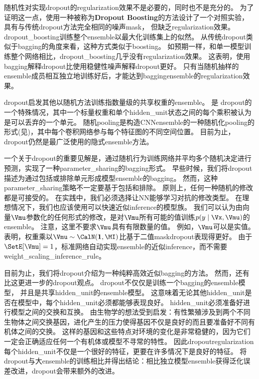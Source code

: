 
随机性对实现\gls{dropout}的\gls{regularization}效果不是必要的，同时也不是充分的。
为了证明这一点，\cite{WardeFarley+al-ICLR2014}使用一种被称为\textbf{Dropout Boosting}的方法设计了一个对照实验，具有与传统\gls{dropout}方法完全相同的噪声\gls{mask}， 但缺乏\gls{regularization}效果。
\gls{dropout_boosting}训练整个\gls{ensemble}以最大化训练集上的似然。
从传统\gls{dropout}类似于\gls{bagging}的角度来看，这种方式类似于\gls{boosting}。
如预期一样，和单一模型训练整个网络相比，\gls{dropout_boosting}几乎没有\gls{regularization}效果。
这表明，使用\gls{bagging}解释\gls{dropout}比使用稳健性噪声解释\gls{dropout}更好。
只有当随机抽样的\gls{ensemble}成员相互独立地训练好后，才能达到\gls{bagging}\gls{ensemble}的\gls{regularization}效果。

\gls{dropout}启发其他以随机方法训练指数量级的共享权重的\gls{ensemble}。
是
\gls{dropout}的一个特殊情况，其中一个标量权重和单个\gls{hidden_unit}状态之间的每个乘积被认为是可以丢弃的一个单元\citep{Wan+al-ICML2013-small}。
随机\gls{pooling}是构造\gls{CNN}\gls{ensemble}的一种随机化\gls{pooling}的形式(见)，其中每个卷积网络参与每个特征图的不同空间位置。
目前为止，\gls{dropout}仍然是最广泛使用的隐式\gls{ensemble}方法。

一个关于\gls{dropout}的重要见解是，通过随机行为训练网络并平均多个随机决定进行预测，实现了一种\gls{parameter_sharing}的\gls{bagging}形式。
早些时候，我们将\gls{dropout}描述为通过包括或排除单元形成模型\gls{ensemble}的\gls{bagging}。
然而，这种\gls{parameter_sharing}策略不一定要基于包括和排除。
原则上，任何一种随机的修改都是可接受的。
在实践中，我们必须选择让\gls{NN}能够学习对抗的修改类型。
在理想情况下，我们也应该使用可以快速近似\gls{inference}的模型族。
我们可以认为由向量$\Vmu$参数化的任何形式的修改，是对$\Vmu$所有可能的值训练$p(y \mid \Vx, \Vmu)$的\gls{ensemble}。
注意，这里不要求$\Vmu$具有有限数量的值。
例如，$\Vmu$可以是实值。
\cite{Srivastava14}表明，权重乘以$\Vmu \sim \CalN(\mathbf{1}, \MI)$比基于二值\gls{mask}\gls{dropout}表现得更好。
由于$\SetE[\Vmu] = 1$，标准网络自动实现\gls{ensemble}的近似\gls{inference}，而不需要\gls{weight_scaling_inference_rule}。


目前为止，我们将\gls{dropout}介绍为一种纯粹高效近似\gls{bagging}的方法。
然而，还有比这更进一步的\gls{dropout}观点。
\gls{dropout}不仅仅是训练一个\gls{bagging}的\gls{ensemble}模型，
并且是共享\gls{hidden_unit}的\gls{ensemble}模型。
这意味着无论其他\gls{hidden_unit}是否在模型中，每个\gls{hidden_unit}必须都能够表现良好。
\gls{hidden_unit}必须准备好进行模型之间的交换和互换。
\cite{Hinton-et-al-arxiv2012-small}由生物学的想法受到启发：有性繁殖涉及到两个不同生物体之间交换基因，进化产生的压力使得基因不仅是良好的而且要准备好不同有机体之间的交换。
这样的基因和这些特点对环境的变化是非常稳健的，因为它们一定会正确适应任何一个有机体或模型不寻常的特性。
因此\gls{dropout}\gls{regularization}每个\gls{hidden_unit}不仅是一个很好的特征，更要在许多情况下是良好的特征。
\cite{WardeFarley+al-ICLR2014}将\gls{dropout}与大\gls{ensemble}的训练相比并得出结论：相比独立模型\gls{ensemble}获得泛化误差改进，\gls{dropout}会带来额外的改进。

